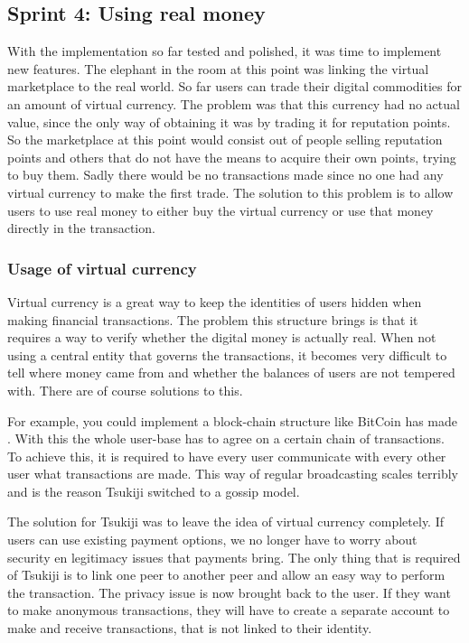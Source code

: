 \subsection{Sprint 4: Using real money}
With the implementation so far tested and polished, it was time to implement new features. 
The elephant in the room at this point was linking the virtual marketplace to the real world.
So far users can trade their digital commodities for an amount of virtual currency.
The problem was that this currency had no actual value, since the only way of obtaining it was by trading it for reputation points.
So the marketplace at this point would consist out of people selling reputation points and others that do not have the means to acquire their own points, trying to buy them.
Sadly there would be no transactions made since no one had any virtual currency to make the first trade.
The solution to this problem is to allow users to use real money to either buy the virtual currency or use that money directly in the transaction.
\subsubsection{Usage of virtual currency}
Virtual currency is a great way to keep the identities of users hidden when making financial transactions. 
The problem this structure brings is that it requires a way to verify whether the digital money is actually real. 
When not using a central entity that governs the transactions, it becomes very difficult to tell where money came from and whether the balances of users are not tempered with.
There are of course solutions to this.

For example, you could implement a block-chain structure like BitCoin has made \cite{bitcoin}.
With this the whole user-base has to agree on a certain chain of transactions.
To achieve this, it is required to have every user communicate with every other user what transactions are made.
This way of regular broadcasting scales terribly and is the reason Tsukiji switched to a gossip model.

The solution for Tsukiji was to leave the idea of virtual currency completely. 
If users can use existing payment options, we no longer have to worry about security en legitimacy issues that payments bring.
The only thing that is required of Tsukiji is to link one peer to another peer and allow an easy way to perform the transaction.
The privacy issue is now brought back to the user. 
If they want to make anonymous transactions, they will have to create a separate account to make and receive transactions, that is not linked to their identity. 

